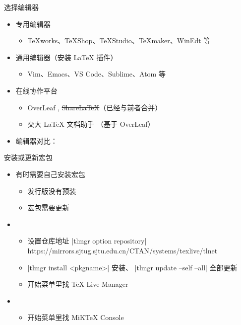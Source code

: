 \begin{frame}{选择编辑器}
  \begin{itemize}
    \item 专用编辑器
          \begin{itemize}
            \item TeXworks、TeXShop、\alert{TeXStudio}、TeXmaker、WinEdt 等
          \end{itemize}
    \item 通用编辑器（安装 \LaTeX{} 插件）
          \begin{itemize}
            \item Vim、Emacs、\alert{VS Code}、Sublime、Atom 等
          \end{itemize}
    \item 在线协作平台
          \begin{itemize}
            \item OverLeaf , \sout{ShareLaTeX}（已经与前者合并）
            \item 交大 LaTeX 文档助手 （基于 OverLeaf）
          \end{itemize}
    \item 编辑器对比：
  \end{itemize}
\end{frame}

\begin{frame}[fragile]{安装或更新宏包}
  \begin{itemize}
    \item 有时需要自己安装宏包
          \begin{itemize}
            \item 发行版没有预装
            \item 宏包需要更新
          \end{itemize}
    \item \TL
          \begin{itemize}
            \item 设置仓库地址 |tlmgr option repository| {\footnotesize\ttfamily
                  https://mirrors.sjtug.sjtu.edu.cn/CTAN/systems/texlive/tlnet}
            \item |tlmgr install <pkgname>| 安装、 |tlmgr update --self --all| 全部更新
            \item \faWindows{} 开始菜单里找 TeX Live Manager
          \end{itemize}
    \item \MiKTeX
          \begin{itemize}
            \item \faWindows{} 开始菜单里找 MiKTeX Console
          \end{itemize}
  \end{itemize}
\end{frame}
